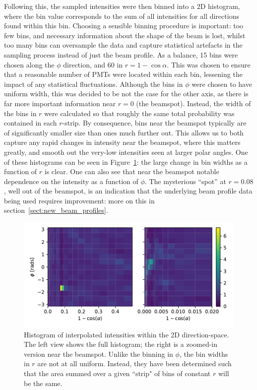 Following this, the sampled intensities were then binned into a 2D histogram, where the bin value corresponds to the sum of all intensities for all directions found within this bin. Choosing a sensible binning procedure is important: too few bins, and necessary information about the shape of the beam is lost, whilst too many bins can oversample the data and capture statistical artefacts in the sampling process instead of just the beam profile. As a balance, 15 bins were chosen along the $\phi$ direction, and 60 in $r=1-\cos\alpha$. This was chosen to ensure that a reasonable number of PMTs were located within each bin, lessening the impact of any statistical fluctuations. Although the bins in $\phi$ were chosen to have uniform width, this was decided to be not the case for the other axis, as there is far more important information near $r = 0$ (the beamspot). Instead, the width of the bins in $r$ were calculated so that roughly the same total probability was contained in each $r$-strip. By consequence, bins near the beamspot typically are of significantly smaller size than ones much further out. This allows us to both capture any rapid changes in intensity near the beamspot, where this matters greatly, and smooth out the very-low intensities seen at larger polar angles. One of these histograms can be seen in Figure~\ref{fig:hist_cdf_old_profile}: the large change in bin widths as a function of $r$ is clear. One can also see that near the beamspot notable dependence on the intensity as a function of $\phi$. The mysterious ``spot'' at $r = 0.08$, well out of the beamspot, is an indication that the underlying beam profile data being used requires improvement: more on this in section~\ref{sect:new_beam_profiles}.

\begin{figure}
    \centering
    \includegraphics[width=\linewidth]{5_SMELLIESimulation/images/FS055_60_alpha_15_phi_hist.pdf}
    \caption{Histogram of interpolated intensities within the 2D direction-space. The left view shows the full histogram; the right is a zoomed-in version near the beamspot. Unlike the binning in $\phi$, the bin widths in $r$ are not at all uniform. Instead, they have been determined such that the area summed over a given ``strip" of bins of constant $r$ will be the same.}
    \label{fig:hist_cdf_old_profile}
\end{figure}

